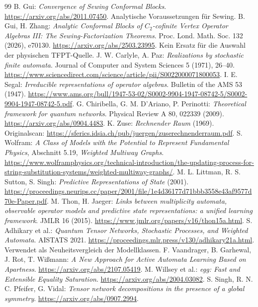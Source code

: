 \begin{thebibliography}{99}
 B. Gui: \emph{Convergence of Sewing Conformal Blocks}. \url{https://arxiv.org/abs/2011.07450}. Analytische Voraussetzungen für Sewing.
 B. Gui, H. Zhang: \emph{Analytic Conformal Blocks of $C_2$-cofinite Vertex Operator Algebras III: The Sewing-Factorization Theorems}. Proc. Lond. Math. Soc. 132 (2026), e70130. \url{https://arxiv.org/abs/2503.23995}. Kein Ersatz für die Auswahl der physischen TFPT-Quelle.
 J. W. Carlyle, A. Paz: \emph{Realizations by stochastic finite automata}. Journal of Computer and System Sciences 5 (1971), 26--40. \url{https://www.sciencedirect.com/science/article/pii/S0022000071800053}.
 I. E. Segal: \emph{Irreducible representations of operator algebras}. Bulletin of the AMS 53 (1947). \url{https://www.ams.org/bull/1947-53-02/S0002-9904-1947-08742-5/S0002-9904-1947-08742-5.pdf}.
 G. Chiribella, G. M. D'Ariano, P. Perinotti: \emph{Theoretical framework for quantum networks}. Physical Review A 80, 022339 (2009). \url{https://arxiv.org/abs/0904.4483}.
 K. Zuse: \emph{Rechnender Raum} (1969). Originalscan: \url{https://sferics.idsia.ch/pub/juergen/zuserechnenderraum.pdf}.
 S. Wolfram: \emph{A Class of Models with the Potential to Represent Fundamental Physics}, Abschnitt 5.19, \emph{Weighted Multiway Graphs}. \url{https://www.wolframphysics.org/technical-introduction/the-updating-process-for-string-substitution-systems/weighted-multiway-graphs/}.
 M. L. Littman, R. S. Sutton, S. Singh: \emph{Predictive Representations of State} (2001). \url{https://proceedings.neurips.cc/paper/2001/file/1e4d36177d71bbb3558e43af9577d70e-Paper.pdf}.
 M. Thon, H. Jaeger: \emph{Links between multiplicity automata, observable operator models and predictive state representations: a unified learning framework}. JMLR 16 (2015). \url{https://www.jmlr.org/papers/v16/thon15a.html}.
 S. Adhikary et al.: \emph{Quantum Tensor Networks, Stochastic Processes, and Weighted Automata}. AISTATS 2021. \url{https://proceedings.mlr.press/v130/adhikary21a.html}. Verwendet als Neuheitsvergleich der Modellklassen.
 F. Vaandrager, B. Garhewal, J. Rot, T. Wißmann: \emph{A New Approach for Active Automata Learning Based on Apartness}. \url{https://arxiv.org/abs/2107.05419}.
 M. Willsey et al.: \emph{egg: Fast and Extensible Equality Saturation}. \url{https://arxiv.org/abs/2004.03082}.
 S. Singh, R. N. C. Pfeifer, G. Vidal: \emph{Tensor network decompositions in the presence of a global symmetry}. \url{https://arxiv.org/abs/0907.2994}.

\end{thebibliography}
